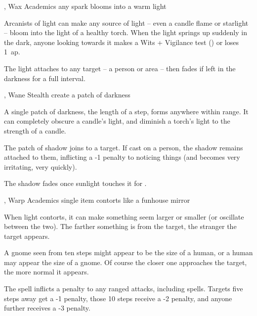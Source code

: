   {\mFire, \mAir}%
  {Wax}%
  {}%
  {Academics}%
  {any spark blooms into a warm light}%
  {
    Arcanists of light can make any source of light -- even a candle flame or starlight -- bloom into the light of a healthy torch.
    When the light springs up suddenly in the dark, anyone looking towards it makes a Wits + Vigilance test () or loses 1~\gls{ap}.

    The light attaches to any target -- a person or area -- then fades if left in the darkness for a full \gls{interval}.
  }

  {\mFire, \mAir}%
  {Wane}%
  {}%
  {Stealth}%
  {create a patch of darkness}%
  {
    A single patch of darkness, the length of a step, forms anywhere within range.
    It can completely obscure a candle's light, and diminish a torch's light to the strength of a candle.

    The patch of shadow joins to a target.
    If cast on a person, the shadow remains attached to them, inflicting a -1 penalty to noticing things (and becomes very irritating, very quickly).

    The shadow fades once sunlight touches it for .
  }

  {\mFire, \mAir}%
  {Warp}%
  {}%
  {Academics}%
  {single item contorts like a funhouse mirror}%
  {
    When light contorts, it can make something seem larger or smaller (or oscillate between the two).
    The farther something is from the target, the stranger the target appears.

    A gnome seen from ten steps might appear to be the size of a human, or a human may appear the size of a gnome.
    Of course the closer one approaches the target, the more normal it appears.

    The spell inflicts a penalty to any ranged attacks, including spells.
    Targets five steps away get a -1 penalty, those 10 steps receive a -2 penalty, and anyone further receives a -3 penalty.
  }
